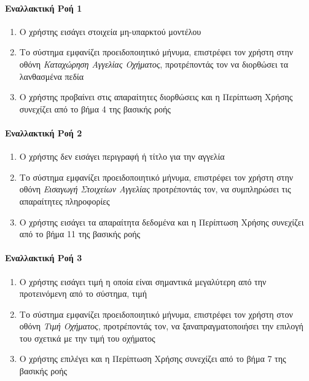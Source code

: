 \documentclass{../ol-softwaremanual}
\begin{document}
	\paragraph{Εναλλακτική Ροή 1}
	
	\begin{enumerate}
		\item O χρήστης εισάγει στοιχεία μη-υπαρκτού μοντέλου
		\item Το σύστημα εμφανίζει προειδοποιητικό μήνυμα, επιστρέφει τον χρήστη στην οθόνη \textit{Καταχώρηση Αγγελίας Οχήματος}, προτρέποντάς τον να διορθώσει τα λανθασμένα πεδία
		\item Ο χρήστης προβαίνει στις απαραίτητες διορθώσεις και η Περίπτωση Χρήσης συνεχίζει από το βήμα 4 της βασικής ροής
	\end{enumerate}
	
	\paragraph{Εναλλακτική Ροή 2}
	
	\begin{enumerate}
		\item Ο χρήστης δεν εισάγει περιγραφή ή τίτλο για την αγγελία
		\item Το σύστημα εμφανίζει προειδοποιητικό μήνυμα, επιστρέφει τον χρήστη στην οθόνη \textit{Εισαγωγή Στοιχείων Αγγελίας} προτρέποντάς τον, να συμπληρώσει τις απαραίτητες πληροφορίες
		\item Ο χρήστης εισάγει τα απαραίτητα δεδομένα και η Περίπτωση Χρήσης συνεχίζει από το βήμα 11 της βασικής ροής
	\end{enumerate}
	
	
	\paragraph{Εναλλακτική Ροή 3}
	
	\begin{enumerate}
		\item Ο χρήστης εισάγει τιμή η οποία είναι σημαντικά μεγαλύτερη από την προτεινόμενη από το σύστημα, τιμή
		\item Το σύστημα εμφανίζει προειδοποιητικό μήνυμα, επιστρέφει τον χρήστη στον οθόνη \textit{Τιμή Οχήματος}, προτρέποντάς τον, να ξαναπραγματοποιήσει την επιλογή του σχετικά με την τιμή του οχήματος
		\item Ο χρήστης επιλέγει και η Περίπτωση Χρήσης συνεχίζει από το βήμα 7 της βασικής ροής
	\end{enumerate}
	
\end{document}
